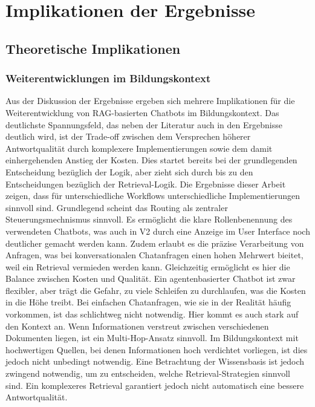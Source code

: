 \chapter{Implikationen der Ergebnisse}
\label{sec:implikationen}

\section{Theoretische Implikationen}

\subsection{Weiterentwicklungen im Bildungskontext}

Aus der Diskussion der Ergebnisse ergeben sich mehrere Implikationen für die Weiterentwicklung von RAG-basierten Chatbots im Bildungskontext.
Das deutlichste Spannungsfeld, das neben der Literatur auch in den Ergebnisse deutlich wird, ist der Trade-off zwischen dem Versprechen höherer Antwortqualität durch komplexere Implementierungen sowie dem damit einhergehenden Anstieg der Kosten.
Dies startet bereits bei der grundlegenden Entscheidung bezüglich der Logik, aber zieht sich durch bis zu den Entscheidungen bezüglich der Retrieval-Logik.
Die Ergebnisse dieser Arbeit zeigen, dass für unterschiedliche Workflows unterschiedliche Implementierungen sinnvoll sind.
Grundlegend scheint das Routing als zentraler Steuerungsmechnismus sinnvoll.
Es ermöglicht die klare Rollenbenennung des verwendeten Chatbots, was auch in V2 durch eine Anzeige im User Interface noch deutlicher gemacht werden kann.
Zudem erlaubt es die präzise Verarbeitung von Anfragen, was bei konversationalen Chatanfragen einen hohen Mehrwert bieitet, weil ein Retrieval vermieden werden kann.
Gleichzeitig ermöglicht es hier die Balance zwischen Kosten und Qualität.
Ein agentenbasierter Chatbot ist zwar flexibler, aber trägt die Gefahr, zu viele Schleifen zu durchlaufen, was die Kosten in die Höhe treibt.
Bei einfachen Chatanfragen, wie sie in der Realität häufig vorkommen, ist das schlichtweg nicht notwendig.
Hier kommt es auch stark auf den Kontext an.
Wenn Informationen verstreut zwischen verschiedenen Dokumenten liegen, ist ein Multi-Hop-Ansatz sinnvoll.
Im Bildungskontext mit hochwertigen Quellen, bei denen Informationen hoch verdichtet vorliegen, ist dies jedoch nicht unbedingt notwendig.
Eine Betrachtung der Wissensbasis ist jedoch zwingend notwendig, um zu entscheiden, welche Retrieval-Strategien sinnvoll sind.
Ein komplexeres Retrieval garantiert jedoch nicht automatisch eine bessere Antwortqualität.
